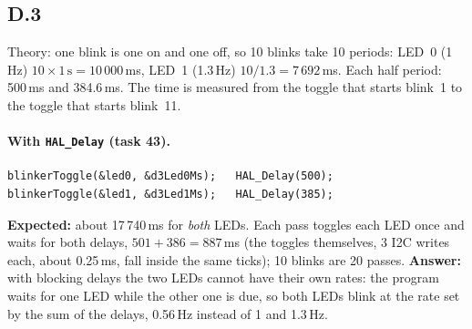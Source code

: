 \documentclass[11pt,a4paper]{article}
\begin{document}
\subsection*{D.3}
Theory: one blink is one on and one off, so 10 blinks take 10 periods: LED~0 (1\,Hz) $10 \times 1\,\text{s} =
10\,000$\,ms, LED~1 (1.3\,Hz) $10 / 1.3 = 7\,692$\,ms. Each half period: 500\,ms and 384.6\,ms. The time is measured
from the toggle that starts blink~1 to the toggle that starts blink~11.

\paragraph{With \texttt{HAL\_Delay} (task 43).}
\begin{lstlisting}
blinkerToggle(&led0, &d3Led0Ms);   HAL_Delay(500);
blinkerToggle(&led1, &d3Led1Ms);   HAL_Delay(385);
\end{lstlisting}
\textbf{Expected:} about 17\,740\,ms for \emph{both} LEDs. Each pass toggles each LED once and waits for both delays,
$501 + 386 = 887$\,ms (the toggles themselves, 3 I2C writes each, about 0.25\,ms, fall inside the same ticks); 10
blinks are 20 passes. \textbf{Answer:} with blocking delays the two LEDs cannot have their own rates: the program
waits for one LED while the other one is due, so both LEDs blink at the rate set by the sum of the delays, 0.56\,Hz
instead of 1 and 1.3\,Hz.
\end{document}
